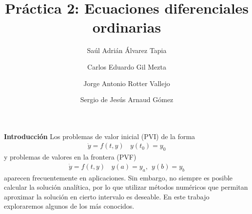 \documentclass[11pt]{article}
\begin{document}
\author{Saúl Adrián Álvarez Tapia \and Carlos Eduardo Gil Mezta \and Jorge Antonio Rotter Vallejo \and Sergio de Jesús Arnaud Gómez}

\title{\Huge Práctica 2: Ecuaciones diferenciales ordinarias}
\date{}
\maketitle

\noindent
\textbf{\LARGE{Introducción}} 
\newline
Los problemas de valor inicial (PVI) de la forma
\begin{align*}
\dot{y} = f(t,y) \ \ \ \ y(t_0) = y_0
\end{align*}
y problemas de valores en la frontera (PVF)
\begin{align*}
\dot{y} = f(t,y) \ \ \ \ y(a) = y_a, \ \ y(b) = y_b
\end{align*}
aparecen frecuentemente en aplicaciones. Sin embargo, no siempre es posible calcular
la solución analítica, por lo que utilizar métodos numéricos que permitan aproximar
la solución en cierto intervalo es deseable. En este trabajo exploraremos algunos de
los más conocidos.
\newline
\end{document}
